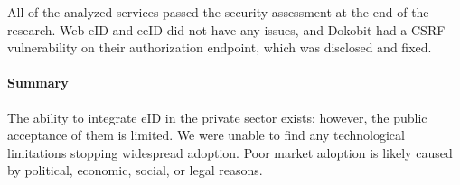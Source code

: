 All of the analyzed services passed the security assessment at the end of the research. Web eID and eeID did not have any issues, and Dokobit had a CSRF vulnerability on their authorization endpoint, which was disclosed and fixed.

\paragraph{Summary} The ability to integrate eID in the private sector exists; however, the public acceptance of them is limited. We were unable to find any technological limitations stopping widespread adoption. Poor market adoption is likely caused by political, economic, social, or legal reasons.